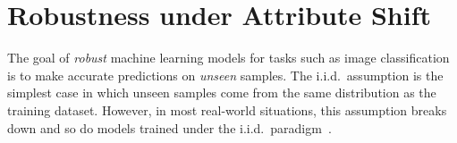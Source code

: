 \chapter{Robustness under Attribute Shift}
\label{chap:agat}



The goal of \textit{robust} machine learning models for tasks such as image classification is to make accurate predictions on \textit{unseen} samples.
The i.i.d.\ assumption is the simplest case in which unseen samples come from the same distribution as the training dataset.
However, in most real-world situations, this assumption breaks down and so do models trained under the i.i.d.\ paradigm~\citep{recht2018cifar, bulusu2020anomalous}.

